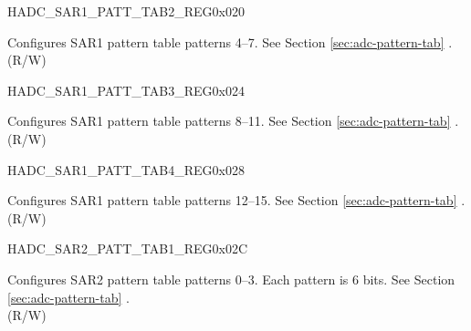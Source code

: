\begin{register}{H}{ADC\_SAR1\_PATT\_TAB2\_REG}{0x020}\label{regdesc:ADCSAR1PATTTAB2REG}
%
%
\regnewline%
\begin{regdesc}\begin{reglist}
\label{fielddesc:ADCSAR1PATTTAB2}\item [ADC\_SAR1\_PATT\_TAB2] Configures SAR1 pattern table patterns 4--7. See Section \ref{sec:adc-pattern-tab} \textit{}.\\
(R/W)
\end{reglist}\end{regdesc}
\end{register}


\begin{register}{H}{ADC\_SAR1\_PATT\_TAB3\_REG}{0x024}\label{regdesc:ADCSAR1PATTTAB3REG}
%
%
\regnewline%
\begin{regdesc}\begin{reglist}
\label{fielddesc:ADCSAR1PATTTAB3}\item [ADC\_SAR1\_PATT\_TAB3] Configures SAR1 pattern table patterns 8--11. See Section \ref{sec:adc-pattern-tab} \textit{}.\\
(R/W)
\end{reglist}\end{regdesc}
\end{register}


\begin{register}{H}{ADC\_SAR1\_PATT\_TAB4\_REG}{0x028}\label{regdesc:ADCSAR1PATTTAB4REG}
%
%
\regnewline%
\begin{regdesc}\begin{reglist}
\label{fielddesc:ADCSAR1PATTTAB4}\item [ADC\_SAR1\_PATT\_TAB4] Configures SAR1 pattern table patterns 12--15. See Section \ref{sec:adc-pattern-tab} \textit{}.\\
(R/W)
\end{reglist}\end{regdesc}
\end{register}


\begin{register}{H}{ADC\_SAR2\_PATT\_TAB1\_REG}{0x02C}\label{regdesc:ADCSAR2PATTTAB1REG}
%
%
\regnewline%
\begin{regdesc}\begin{reglist}
\label{fielddesc:ADCSAR2PATTTAB1}\item [ADC\_SAR2\_PATT\_TAB1] Configures SAR2 pattern table patterns 0--3. Each pattern is 6 bits. See Section \ref{sec:adc-pattern-tab} \textit{}.\\
(R/W)
\end{reglist}\end{regdesc}
\end{register}


